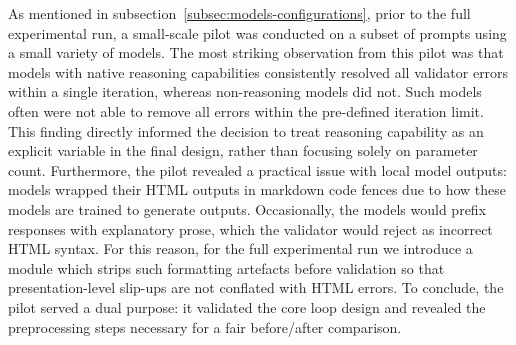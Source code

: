 


As mentioned in subsection~\ref{subsec:models-configurations}, prior to the full experimental run, a small-scale pilot was conducted on a subset of prompts using a small variety of models. The most striking observation from this pilot was that models with native reasoning capabilities consistently resolved all validator errors within a single iteration, whereas non-reasoning models did not. Such models often were not able to remove all errors within the pre-defined iteration limit. This finding directly informed the decision to treat reasoning capability as an explicit variable in the final design, rather than focusing solely on parameter count. Furthermore, the pilot revealed a practical issue with local model outputs: models wrapped their HTML outputs in markdown code fences due to how these models are trained to generate outputs. Occasionally, the models would prefix responses with explanatory prose, which the validator would reject as incorrect HTML syntax. For this reason, for the full experimental run we introduce a module which strips such formatting artefacts before validation so that presentation-level slip-ups are not conflated with HTML errors. To conclude, the pilot served a dual purpose: it validated the core loop design and revealed the preprocessing steps necessary for a fair before/after comparison.